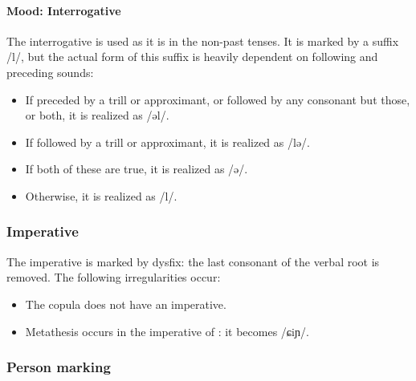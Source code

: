 \documentclass{article}
\newcommand{\con}[1]{\hspace{0pt}{\color{olive}#1}}
\begin{document}
\paragraph{Mood: Interrogative} The interrogative is used as it is in the non-past tenses. It is marked by a suffix \con{-l} /l/, but the actual form of this suffix is heavily dependent on following and preceding sounds:
\begin{itemize}
\item If preceded by a trill or approximant, or followed by any consonant but those, or both, it is realized as /əl/.
\item If followed by a trill or approximant, it is realized as /lə/.
\item If both of these are true, it is realized as /ə/.
\item Otherwise, it is realized as /l/.
\end{itemize}

\subsubsection{Imperative}
The imperative is marked by dysfix: the last consonant of the verbal root is removed. The following irregularities occur:
\begin{itemize}
\item The copula \con{am} does not have an imperative.
\item Metathesis occurs in the imperative of \con{śgnil}: it becomes \con{śign} /ɕiɲ/.
\end{itemize}

\subsubsection{Person marking} \label{sssec:person-markers}
\end{document}
